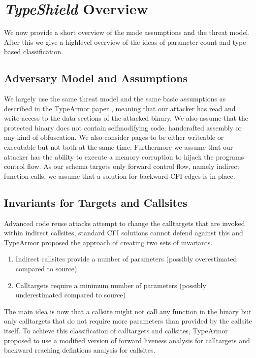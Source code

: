 \chapter{\textit{TypeShield} Overview}
\label{chapter:TypeShild Overview}
We now provide a short overview of the made assumptions and the threat model. After this we give a highlevel overview of the ideas of parameter count and type based classification.

\section{Adversary Model and Assumptions}
\label{Adversary Model}
We largely use the same threat model and the same basic assumptions as described in the TypeArmor paper \cite{veen:typearmor}, meaning that our attacker has read and write access to the data sections of the attacked binary.  We also assume that the protected binary does not contain selfmodifying code, handcrafted assembly or any kind of obfuscation. We also consider pages to be either writeable or executable but not both at the same time. Furthermore we assume that our attacker has the ability to execute a memory corruption to hijack the programs control flow. As our schema targets only forward control flow, namely indirect function calls, we assume that a solution for backward CFI edges is in place.


\section{Invariants for Targets and Callsites}
\label{Invariants for Targets and Callsites}
Advanced code reuse attacks attempt to change the calltargets that are invoked within indirect callsites, standard CFI solutions cannot defend against this and TypeArmor proposed the approach of creating two sets of invariants. 

\begin{enumerate}
\item Indirect callsites provide a number of parameters (possibly overestimated compared to source)
\item Calltargets require a minimum number of parameters (possibly underestimated compared to source)
\end{enumerate}

The main idea is now that a callsite might not call any function in the binary but only calltargets that do not require more parameters than provided by the callsite itself. To achieve this classification of calltargets and callsites, TypeArmor proposed to use a modified version of forward liveness analysis for calltargets and backward reaching defintions analysis for callsites.



